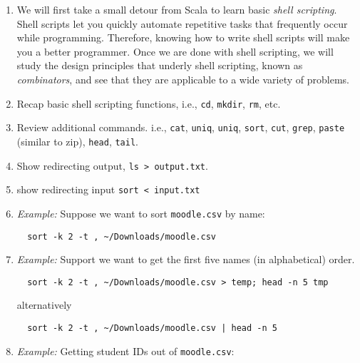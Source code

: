 \documentclass[9pt]{extbook}
\begin{document}
\begin{enumerate}

  \item We will first take a small detour from Scala to learn basic
\emph{shell scripting}. Shell scripts let you quickly automate repetitive tasks
that frequently occur while programming. Therefore, knowing how to write shell
scripts will make you a better programmer. Once we are done with shell
scripting, we will study the design principles that underly shell scripting,
known as \emph{combinators}, and see that they are applicable to a wide variety
of problems.


  \item Recap basic shell scripting functions, i.e., \lstinline|cd|, \lstinline|mkdir|, \lstinline|rm|, etc.

  \item Review additional commands. i.e., \lstinline|cat|, \lstinline|uniq|,
  \lstinline|uniq|, \lstinline|sort|, \lstinline|cut|, \lstinline|grep|,
  \lstinline|paste| (similar to zip), \lstinline|head|, \lstinline|tail|.


  \item Show redirecting output, \lstinline|ls > output.txt|.

  \item show redirecting input \lstinline|sort < input.txt|

  \item \emph{Example:} Suppose we want to sort \lstinline|moodle.csv| by name:

  \begin{lstlisting}
  sort -k 2 -t , ~/Downloads/moodle.csv
  \end{lstlisting}

  \item \emph{Example:} Support we want to get the first five names (in alphabetical)
  order.


  \begin{lstlisting}
  sort -k 2 -t , ~/Downloads/moodle.csv > temp; head -n 5 tmp
  \end{lstlisting}

  alternatively

  \begin{lstlisting}
  sort -k 2 -t , ~/Downloads/moodle.csv | head -n 5
  \end{lstlisting}
  

  \item \emph{Example:} Getting student IDs out of \lstinline|moodle.csv|:


\end{enumerate}
\end{document}
